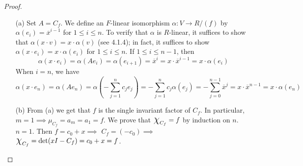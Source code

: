 \documentclass[11pt]{book}
\theoremstyle{definition}   \newtheorem{defn}[counter]{Definition} %
\newcommand{\ov}{\overline}   \newcommand{\wt}{\widetilde}
\newcommand{\Chi}{\mbox{\Large $\chi$}}
\DeclareMathOperator{\ra}{\rightarrow}   \DeclareMathOperator{\Poly}{\mathbf{P}}   \DeclareMathOperator{\spn}{\textnormal{span}}   \DeclareMathOperator{\aut}{\textnormal{Aut}}
\numberwithin{counter}{chapter}
\begin{document}
\begin{proof}\
\begin{enumerate}
\item[(a)] Set $A = C_f$. We define an $F$-linear isomorphism $\alpha : V \ra R/(f)$ by $\alpha(e_i) = \ov{x}^{i-1}$ for $1 \leq i \leq n$. To verify that $\alpha$ is $R$-linear, it suffices to show that $\alpha(x \cdot v) = x \cdot \alpha(v)$ (see 4.1.4); in fact, it suffices to show $\alpha(x \cdot e_i) = x \cdot \alpha(e_i)$ for $1 \leq i \leq n$. If $1 \leq i \leq n-1$, then
	\[\alpha(x \cdot e_i) = \alpha(A e_i) = \alpha(e_{i+1}) = \ov{x}^i = x \cdot \ov{x}^{i-1} = x \cdot \alpha(e_i) \]
When $i = n$, we have
	\[\alpha(x \cdot e_n) = \alpha(A e_n) = \alpha\left(-\sum_{j=1}^n c_j e_j \right) = -\sum_{j=1}^n c_j \alpha(e_j) = -\sum_{j=0}^{n-1} \ov{x}^j = x \cdot \ov{x}^{n-1} = x \cdot \alpha(e_n) \]

\item[(b)] From (a) we get that $f$ is the single invariant factor of $C_f$. In particular, $m = 1 \implies \mu_{C_f} = a_m = a_1 = f$. We prove that $\Chi_{C_f} = f$ by induction on $n$. \\

$n = 1$. Then $f = c_0 + x \implies $ $C_f = (-c_0) \implies $ $\Chi_{C_f} = \det(xI - C_f) = c_0 + x = f$. \\


\end{enumerate}
\end{proof}
\end{document}
